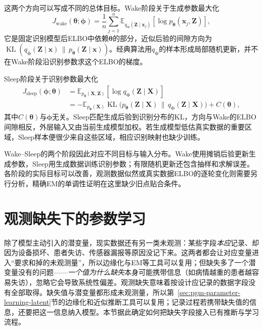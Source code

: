 这两个方向可以写成不同的总体目标。Wake阶段关于生成参数最大化
\begin{equation}
  J_{\mathrm{wake}}(\bm{\theta};\bm{\phi})
  =\frac{1}{n}\sum_{j=1}^n
    \mathbb{E}_{q_{\bm{\phi}}(\bm{Z}\mid\bm{x}_j)}
      [\log p_{\bm{\theta}}(\bm{x}_j,\bm{Z})],
  \label{eq:pgm-parameter-learning-wake-objective}
\end{equation}
它是固定识别模型后ELBO中依赖$\bm{\theta}$的部分，近似后验的间隙方向为$\operatorname{KL}(q_{\bm{\phi}}(\bm{Z}\mid\bm{x})\,\|\,p_{\bm{\theta}}(\bm{Z}\mid\bm{x}))$。经典算法用$q_{\bm{\phi}}$的样本形成局部随机更新，并不在Wake阶段沿识别参数求这个ELBO的梯度。

Sleep阶段关于识别参数最大化
\begin{equation}
  \begin{aligned}
    J_{\mathrm{sleep}}(\bm{\phi};\bm{\theta})
      &=\mathbb{E}_{p_{\bm{\theta}}(\bm{X},\bm{Z})}
          [\log q_{\bm{\phi}}(\bm{Z}\mid\bm{X})]\\
      &=-\mathbb{E}_{p_{\bm{\theta}}(\bm{X})}
          \operatorname{KL}\bigl(
            p_{\bm{\theta}}(\bm{Z}\mid\bm{X})
            \,\|\,q_{\bm{\phi}}(\bm{Z}\mid\bm{X})\bigr)+C(\bm{\theta}),
  \end{aligned}
  \label{eq:pgm-parameter-learning-sleep-objective}
\end{equation}
其中$C(\bm{\theta})$与$\bm{\phi}$无关。Sleep匹配生成后验到识别分布的KL，方向与Wake的ELBO间隙相反，外层输入又由当前生成模型加权。若生成模型低估真实数据的重要区域，Sleep样本便很少来自这些区域，相应识别映射也缺少训练。

Wake--Sleep的两个阶段因此对应不同目标与输入分布。Wake使用摊销后验更新生成参数，Sleep用生成数据训练识别参数；有限随机更新还包含抽样和求解误差。各阶段的实际目标可以改善，观测数据似然或真实数据ELBO的逐轮变化则需要另行分析，精确EM的单调性证明在这里缺少旧点贴合条件。

\section{观测缺失下的参数学习}
\label{sec:pgm-parameter-learning-incomplete}

除了模型主动引入的潜变量，现实数据还有另一类未观测：某些字段\emph{本应}记录、却因为设备损坏、患者失访、传感器漏报等原因没记下来。这两者都会让对应变量进入“要求和掉的未观测量”，所以边缘化与EM等工具可以复用；但缺失多了一个潜变量没有的问题——\emph{一个值为什么缺失}本身可能携带信息（如病情越重的患者越容易失访），忽略它会导致系统性偏差。观测缺失意味着按设计应记录的数据字段没有全部取得。缺失值与潜变量都形成未观测量，所以第~\ref{sec:pgm-parameter-learning-latent}节的边缘化和近似推断工具可以复用；记录过程若携带缺失值的信息，还要把这一信息纳入模型。本节据此确定如何把缺失字段接入已有推断与学习流程。


